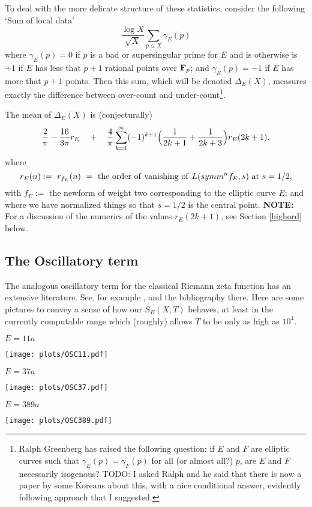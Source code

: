 \documentclass[11pt]{article}
\theoremstyle{plain}
\theoremstyle{definition}
\numberwithin{equation}{section}
\numberwithin{figure}{section}
\numberwithin{table}{section}
\begin{document}
To deal with the more delicate structure of these statistics, consider the following `Sum of local data'
  $${\frac{\log X}{{\sqrt X}}}\sum_{p\le X}\gamma_E(p)$$  where $\gamma_E(p)=0$ if $p$ is a bad or supersingular prime for $E$ and is otherwise is $+1$ if $E$ has less that $p+1$ rational points over ${\bf F}_p$; and $\gamma_E(p) = -1$ if $E$ has more that $p+1$ points.  Then this sum, which will be denoted $\Delta_E(X)$, measures exactly the difference between over-count and under-count{\footnote{  Ralph Greenberg has raised the following question: if $E$ and $F$ are elliptic curves such that $\gamma_E(p)=\gamma_F(p)$ for all (or almost all?) $p$, are $E$ and $F$ necessarily isogenous?  TODO: I asked Ralph and he said that there is now a paper by some Koreans about this, with a nice conditional answer, evidently
  following approach that I suggested.}}. %

 The  mean of $\Delta_E(X)$ is  (conjecturally) \begin{equation*}
{\frac{2}{\pi}}- {\frac{16}{3\pi}}r_E \ \ \ + \ \ \  {\frac{4}{\pi}} \sum_{k=1}^{\infty}  (-1)^{k+1}\Bigl({\frac{1}{2k+1}} + {\frac{1}{2k+3}}\Bigr) r_E({2k+1}).
\end{equation*} where $$r_E(n):= \ r_{f_E}(n)\ = \ {\rm the\ order\ of\ vanishing\ of\ }L(symm^nf_E, s)\ {\rm at}\ s=1/2,$$ with $f_E:=$ the newform of weight two corresponding to the elliptic curve $E$; and where we have normalized things so that $s=1/2$ is the central point. {\bf NOTE:} For a discussion of the numerics of the values $r_E({2k+1})$, see Section {\ref{highord}} below.

    \subsection{The Oscillatory term}\label{osc}
   The analogous oscillatory term for the classical Riemann zeta function  has an extensive literature. See, for example \cite{G}, \cite{Fu} and the bibliography there. Here are some pictures to convey a sense of how our $S_E(X;T)$ behaves, at least in the currently computable range which (roughly) allows $T$ to be only as high as  $10^4$.


  \centerline{ $E = 11a$}
 \vskip10pt
 \texttt{[image: plots/OSC11.pdf]}

  \centerline{ $E = 37a$}
 \texttt{[image: plots/OSC37.pdf]}
   \vskip20pt
  \centerline{ $E = 389a$}
\vskip20pt
 \texttt{[image: plots/OSC389.pdf]}
\end{document}
